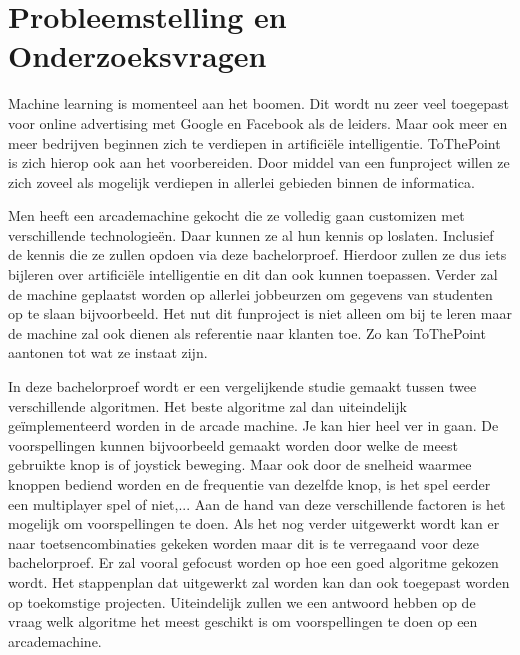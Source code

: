 \section{Probleemstelling en Onderzoeksvragen}
\label{sec:onderzoeksvragen}


Machine learning is momenteel aan het boomen. Dit wordt nu zeer veel toegepast voor online advertising met Google en Facebook als de leiders. Maar ook meer en meer bedrijven beginnen zich te verdiepen in artificiële intelligentie. ToThePoint is zich hierop ook aan het voorbereiden. Door middel van een funproject willen ze zich zoveel als mogelijk verdiepen in allerlei gebieden binnen de informatica.

Men heeft een arcademachine gekocht die ze volledig gaan customizen met verschillende technologieën. Daar kunnen ze al hun kennis op loslaten. Inclusief de kennis die ze zullen opdoen via deze bachelorproef. Hierdoor zullen ze dus iets bijleren over artificiële intelligentie en dit dan ook kunnen toepassen. Verder zal de machine geplaatst worden op allerlei jobbeurzen om gegevens van studenten op te slaan bijvoorbeeld. Het nut dit funproject is niet alleen om bij te leren maar de machine zal ook dienen als referentie naar klanten toe. Zo kan ToThePoint aantonen tot wat ze instaat zijn. 

In deze bachelorproef wordt er een vergelijkende studie gemaakt tussen twee verschillende algoritmen. Het beste algoritme zal dan uiteindelijk geïmplementeerd worden in de arcade machine. Je kan hier heel ver in gaan. De voorspellingen kunnen bijvoorbeeld gemaakt worden door welke de meest gebruikte knop is of joystick beweging. Maar ook door de snelheid waarmee knoppen bediend worden en de frequentie van dezelfde knop, is het spel eerder een multiplayer spel of niet,...  Aan de hand van deze verschillende factoren is het mogelijk om voorspellingen te doen. Als het nog verder uitgewerkt wordt kan er naar toetsencombinaties gekeken worden maar dit is te verregaand voor deze bachelorproef. Er zal vooral gefocust worden op hoe een goed algoritme gekozen wordt. Het stappenplan dat uitgewerkt zal worden kan dan ook toegepast worden op toekomstige projecten. Uiteindelijk zullen we een antwoord hebben op de vraag welk algoritme het meest geschikt is om voorspellingen te doen op een arcademachine.



